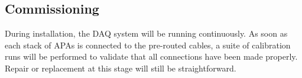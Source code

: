 %
\subsection{Commissioning } 
\label{sec:ce_install_commission}

During installation, the DAQ system will be running continuously.
As soon as each stack of APAs is connected to the pre-routed cables, 
a suite of calibration runs will be performed to validate that all connections have been made properly.
Repair or replacement at this stage will still be straightforward.

%

